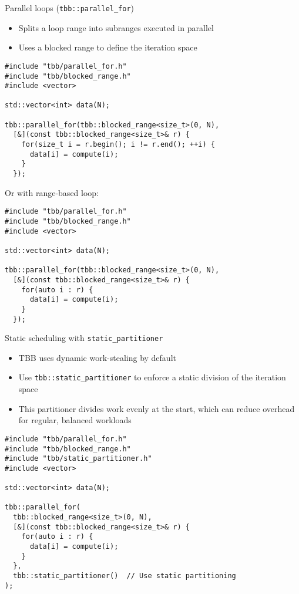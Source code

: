 \documentclass{beamer}
\begin{document}
\begin{frame}[fragile]{Parallel loops (\texttt{tbb::parallel\_for})}
  \begin{itemize}
    \item Splits a loop range into subranges executed in parallel
    \item Uses a blocked range to define the iteration space
  \end{itemize}
  \vspace{0.5em}
  \lstset{style=CStyle}
  \begin{lstlisting}
#include "tbb/parallel_for.h"
#include "tbb/blocked_range.h"
#include <vector>

std::vector<int> data(N);

tbb::parallel_for(tbb::blocked_range<size_t>(0, N),
  [&](const tbb::blocked_range<size_t>& r) {
    for(size_t i = r.begin(); i != r.end(); ++i) {
      data[i] = compute(i);
    }
  });
  \end{lstlisting}

  Or with range-based loop:

  \lstset{style=CStyle}
  \begin{lstlisting}
#include "tbb/parallel_for.h"
#include "tbb/blocked_range.h"
#include <vector>

std::vector<int> data(N);

tbb::parallel_for(tbb::blocked_range<size_t>(0, N),
  [&](const tbb::blocked_range<size_t>& r) {
    for(auto i : r) {
      data[i] = compute(i);
    }
  });
  \end{lstlisting}
\end{frame}

\begin{frame}[fragile]{Static scheduling with \texttt{static\_partitioner}}
  \begin{itemize}
    \item TBB uses dynamic work-stealing by default
    \item Use \texttt{tbb::static\_partitioner} to enforce a static division of the iteration space
    \item This partitioner divides work evenly at the start, which can reduce overhead for regular, balanced workloads
  \end{itemize}

  \vspace{0.5em}

  \lstset{style=CStyle}
  \begin{lstlisting}
#include "tbb/parallel_for.h"
#include "tbb/blocked_range.h"
#include "tbb/static_partitioner.h"
#include <vector>

std::vector<int> data(N);

tbb::parallel_for(
  tbb::blocked_range<size_t>(0, N),
  [&](const tbb::blocked_range<size_t>& r) {
    for(auto i : r) {
      data[i] = compute(i);
    }
  },
  tbb::static_partitioner()  // Use static partitioning
);
  \end{lstlisting}
\end{frame}
\end{document}
